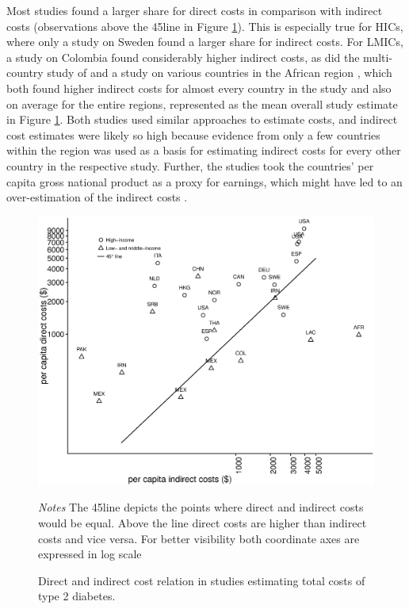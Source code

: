 Most studies found a larger share for direct costs in comparison with indirect costs (observations above the 45\degree line in Figure \ref{fig:review_direct_indirect}). This is especially true for \acp{HIC}, where only a study on Sweden \parencite{Bolin2009d} found a larger share for indirect costs. For \acp{LMIC}, a study on Colombia \parencite{Gonzalez2009b} found considerably higher indirect costs, as did the multi-country study of \textcite{Barcelo2003} and a study on various countries in the African region \parencite{Kirigia2009}, which both found higher indirect costs for almost every country in the study and also on average for the entire regions, represented as the mean overall study estimate in Figure \ref{fig:review_direct_indirect}.  Both studies used similar approaches to estimate costs, and indirect cost estimates were likely so high because evidence from only a few countries within the region was used as a basis for estimating indirect costs for every other country in the respective study. Further, the studies took the countries' per capita gross national product as a proxy for earnings, which might have led to an over-estimation of the indirect costs \parencite{Kirigia2009}.

\begin{figure}[hp]
\caption{\label{fig:review_direct_indirect}Direct and indirect cost relation in studies estimating total costs of type 2 diabetes.}%
\begin{minipage}{\linewidth}
\begin{center}
\includegraphics[width=1\linewidth]{Review/Figures/Fig4.eps}\\
\end{center}
\footnotesize
\textit{Notes} The 45\degree line depicts the points where direct and indirect costs would be equal. Above the line direct costs are higher than indirect costs and vice versa. For better visibility both coordinate axes are expressed in log scale
\end{minipage}
\end{figure}


